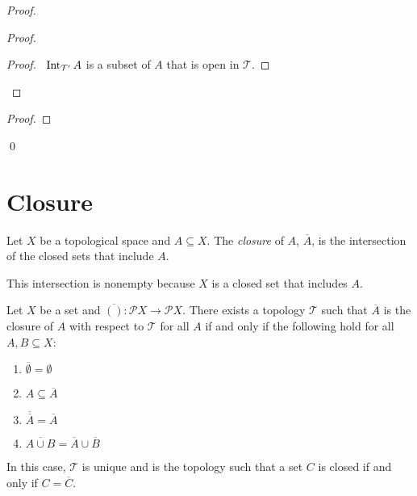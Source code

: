 \begin{proof}
  \pf
  \begin{proof}
    \begin{proof}
      \pf\ $\operatorname{Int}_{\mathcal{T}'} A$ is a subset of $A$ that is open in $\mathcal{T}$.
    \end{proof}
  \end{proof}
  \begin{proof}
  \end{proof}
  \qed
\end{proof}

\section{Closure}

\begin{df}[Closure]
  Let $X$ be a topological space and $A \subseteq X$.
  The \emph{closure} of $A$, $\overline{A}$, is the intersection of the closed sets that include $A$.

  This intersection is nonempty because $X$ is a closed set that includes $A$.
\end{df}

\begin{prop}
  \label{prop:closure}
Let $X$ be a set and $\overline{( )} : \mathcal{P} X \rightarrow \mathcal{P} X$. There exists a topology $\mathcal{T}$ such that
$\overline{A}$ is the closure of $A$ with respect to $\mathcal{T}$ for all $A$ if and only if the following hold for all $A, B \subseteq X$:
\begin{enumerate}
  \item
  $\overline{\emptyset} = \emptyset$
  \item
  $A \subseteq \overline{A}$
  \item
  $\overline{\overline{A}} = \overline{A}$
  \item
  $\overline{A \cup B} = \overline{A} \cup \overline{B}$
\end{enumerate}
In this case, $\mathcal{T}$ is unique and is the topology such that a set $C$ is closed if and only if $C = \overline{C}$.
\end{prop}


